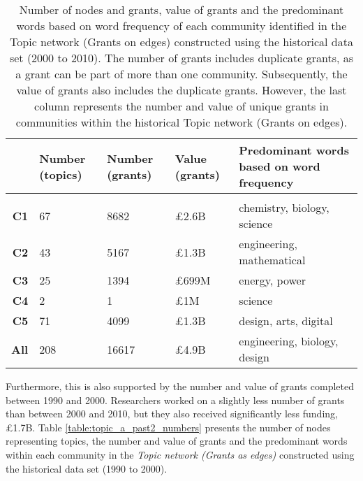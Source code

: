 {\begin{table}[!htbp]
\centering
\caption[Number of nodes and grants, value of grants and the predominant words of each community identified in the Topic network (Grants on edges) constructed using the historical data set (2000 to 2010)]{Number of nodes and grants, value of grants and the predominant words based on word frequency of each community identified in the Topic network (Grants on edges) constructed using the historical data set (2000 to 2010). The number of grants includes duplicate grants, as a grant can be part of more than one community. Subsequently, the value of grants also includes the duplicate grants. However, the last column represents the number and value of unique grants in communities within the historical Topic network (Grants on edges).}
\label{table:topic_a_past1_numbers}
\begin{tabular}{r|>{\raggedleft\arraybackslash}p{1.6cm}>{\raggedleft\arraybackslash}p{1.6cm}>{\raggedleft\arraybackslash}p{1.6cm}>{\raggedleft\arraybackslash}p{6.3cm}}
{} & \textbf{Number (topics)} & \textbf{Number (grants)} & \textbf{Value (grants)} & \textbf{Predominant words based on word frequency}\\
\hline\\
\textbf{C1}  & {67}  & {8682}  & {\pounds2.6B} & {chemistry, biology, science}\\
\textbf{C2}  & {43}  & {5167}  & {\pounds1.3B} & {engineering, mathematical}\\
\textbf{C3}  & {25}  & {1394}  & {\pounds699M} & {energy, power}\\
\textbf{C4}  & {2}   & {1}     & {\pounds1M}   & {science}\\
\textbf{C5}  & {71}  & {4099}  & {\pounds1.3B} & {design, arts, digital}\\
\textbf{All} & {208} & {16617} & {\pounds4.9B} & {engineering, biology, design}\\
\end{tabular}
\end{table}

Furthermore, this is also supported by the number and value of grants completed between 1990 and 2000. Researchers worked on a slightly less number of grants than between 2000 and 2010, but they also received significantly less funding, \pounds1.7B. Table \ref{table:topic_a_past2_numbers} presents the number of nodes representing topics, the number and value of grants and the predominant words within each community in the \textit{Topic network (Grants as edges)} constructed using the historical data set (1990 to 2000).

}
